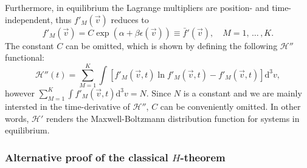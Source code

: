 Furthermore, in equilibrium the Lagrange multipliers are position- and time-independent,
thus $f'_M(\vec{v})$
reduces to
%
\begin{equation}\label{eq:fbardef}
    f'_M(\vec{v})=C\exp\left(\alpha+\beta \epsilon(\vec{v})\right)
    \equiv \bar{f}'(\vec{v}),\quad M=1,\,\dots\,,K.
\end{equation} 
%
The constant $C$ can be omitted, which is shown by defining the following $\mathcal{H}''$
functional:
%
\begin{equation}
   \mathcal{H}''(t)=\sum_{M=1}^{K}\int \left[f'_M(\vec{v},t)
    \ln f'_M(\vec{v},t)-f'_M(\vec{v},t)\right]\mathrm{d}^3v  \label{CH3},
\end{equation}
%
however $\sum_{M=1}^{K} \int f'_M(\vec{v},t)\mathrm{d}^3v =N$.
Since $N$ is a constant and we are mainly intersted in the time-derivative of $\mathcal{H}''$,
$C$ can be conveniently omitted. In other words, $\mathcal{H}'$ renders the Maxwell-Boltzmann
distribution function for systems in equilibrium.

\subsubsection{Alternative proof of the classical $H$-theorem}

